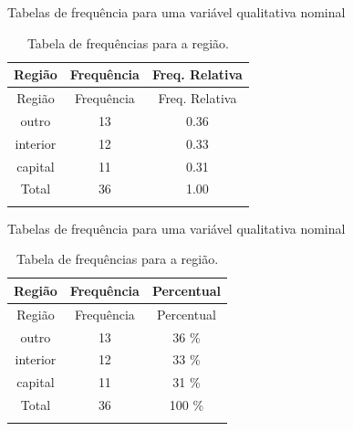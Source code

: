 \documentclass[
  ignorenonframetext,
  serif,
  professionalfont,
  usenames,
  dvipsnames,
  aspectratio = 169]{beamer}
\begin{document}
\begin{frame}{Tabelas de frequência para uma variável qualitativa
nominal}
\label{tabelas-de-frequuxeancia-para-uma-variuxe1vel-qualitativa-nominal-1}
\begin{longtable}[]{@{}ccc@{}}
\caption{Tabela de frequências para a região.}\tabularnewline
\toprule\noalign{}
Região & Frequência & Freq. Relativa \\
\midrule\noalign{}
\endfirsthead
\toprule\noalign{}
Região & Frequência & Freq. Relativa \\
\midrule\noalign{}
\endhead
outro & 13 & 0.36 \\
interior & 12 & 0.33 \\
capital & 11 & 0.31 \\
Total & 36 & 1.00 \\
\bottomrule\noalign{}
\end{longtable}
\end{frame}

\begin{frame}{Tabelas de frequência para uma variável qualitativa
nominal}
\label{tabelas-de-frequuxeancia-para-uma-variuxe1vel-qualitativa-nominal-2}
\begin{longtable}[]{@{}ccc@{}}
\caption{Tabela de frequências para a região.}\tabularnewline
\toprule\noalign{}
Região & Frequência & Percentual \\
\midrule\noalign{}
\endfirsthead
\toprule\noalign{}
Região & Frequência & Percentual \\
\midrule\noalign{}
\endhead
outro & 13 & 36 \% \\
interior & 12 & 33 \% \\
capital & 11 & 31 \% \\
Total & 36 & 100 \% \\
\bottomrule\noalign{}
\end{longtable}
\end{frame}
\end{document}
